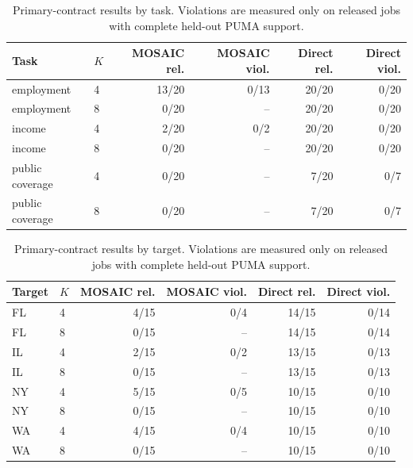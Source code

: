 \begin{table}[t]
\centering
\scriptsize
\setlength{\tabcolsep}{3.5pt}
\begin{tabular}{llrrrr}
\hline
Task & $K$ & MOSAIC rel. & MOSAIC viol. & Direct rel. & Direct viol. \\
\hline
employment & 4 & 13/20 & 0/13 & 20/20 & 0/20 \\
employment & 8 & 0/20 & -- & 20/20 & 0/20 \\
income & 4 & 2/20 & 0/2 & 20/20 & 0/20 \\
income & 8 & 0/20 & -- & 20/20 & 0/20 \\
public coverage & 4 & 0/20 & -- & 7/20 & 0/7 \\
public coverage & 8 & 0/20 & -- & 7/20 & 0/7 \\
\hline
\end{tabular}
\caption{Primary-contract results by task. Violations are measured only on released jobs with complete held-out PUMA support.}
\label{supp:tab:acs-natural-task}
\end{table}

\begin{table}[t]
\centering
\scriptsize
\setlength{\tabcolsep}{3.5pt}
\begin{tabular}{llrrrr}
\hline
Target & $K$ & MOSAIC rel. & MOSAIC viol. & Direct rel. & Direct viol. \\
\hline
FL & 4 & 4/15 & 0/4 & 14/15 & 0/14 \\
FL & 8 & 0/15 & -- & 14/15 & 0/14 \\
IL & 4 & 2/15 & 0/2 & 13/15 & 0/13 \\
IL & 8 & 0/15 & -- & 13/15 & 0/13 \\
NY & 4 & 5/15 & 0/5 & 10/15 & 0/10 \\
NY & 8 & 0/15 & -- & 10/15 & 0/10 \\
WA & 4 & 4/15 & 0/4 & 10/15 & 0/10 \\
WA & 8 & 0/15 & -- & 10/15 & 0/10 \\
\hline
\end{tabular}
\caption{Primary-contract results by target. Violations are measured only on released jobs with complete held-out PUMA support.}
\label{supp:tab:acs-natural-state}
\end{table}
